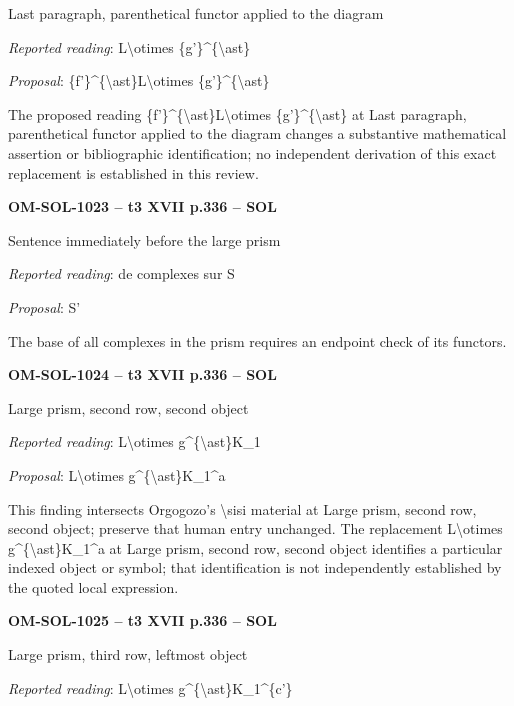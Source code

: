 Last paragraph, parenthetical functor applied to the diagram\par
\emph{Reported reading}: L\textbackslash{}otimes \{g'\}\textasciicircum{}\{\textbackslash{}ast\}\par
\emph{Proposal}: \{f'\}\textasciicircum{}\{\textbackslash{}ast\}L\textbackslash{}otimes \{g'\}\textasciicircum{}\{\textbackslash{}ast\}\par
The proposed reading \{f'\}\textasciicircum{}\{\textbackslash{}ast\}L\textbackslash{}otimes \{g'\}\textasciicircum{}\{\textbackslash{}ast\} at Last paragraph, parenthetical functor applied to the diagram changes a substantive mathematical assertion or bibliographic identification; no independent derivation of this exact replacement is established in this review.\par
\par\noindent\textbf{OM-SOL-1023 -- t3 XVII p.336 -- SOL}\par
Sentence immediately before the large prism\par
\emph{Reported reading}: de complexes sur S\par
\emph{Proposal}: S'\par
The base of all complexes in the prism requires an endpoint check of its functors.\par
\par\noindent\textbf{OM-SOL-1024 -- t3 XVII p.336 -- SOL}\par
Large prism, second row, second object\par
\emph{Reported reading}: L\textbackslash{}otimes g\textasciicircum{}\{\textbackslash{}ast\}K\_1\par
\emph{Proposal}: L\textbackslash{}otimes g\textasciicircum{}\{\textbackslash{}ast\}K\_1\textasciicircum{}a\par
This finding intersects Orgogozo's \textbackslash{}sisi material at Large prism, second row, second object; preserve that human entry unchanged. The replacement L\textbackslash{}otimes g\textasciicircum{}\{\textbackslash{}ast\}K\_1\textasciicircum{}a at Large prism, second row, second object identifies a particular indexed object or symbol; that identification is not independently established by the quoted local expression.\par
\par\noindent\textbf{OM-SOL-1025 -- t3 XVII p.336 -- SOL}\par
Large prism, third row, leftmost object\par
\emph{Reported reading}: L\textbackslash{}otimes g\textasciicircum{}\{\textbackslash{}ast\}K\_1\textasciicircum{}\{c'\}\par
